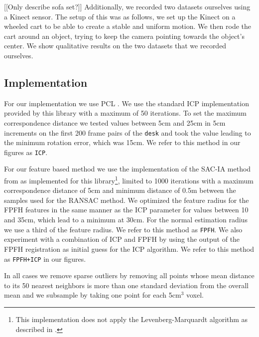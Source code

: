 \documentclass[a4paper]{article}
\begin{document}
[[Only describe sofa set?]]
Additionally, we recorded two datasets ourselves using a Kinect sensor. The setup of this was as follows, we set up the Kinect on a wheeled cart to be able to create a stable and uniform motion. We then rode the cart around an object, trying to keep the camera pointing towards the object's center. We show qualitative results on the two datasets that we recorded ourselves.

\subsection{Implementation}

For our implementation we use \ac{PCL} \cite{Rusu_ICRA2011_PCL}. We use the standard \ac{ICP} implementation provided by this library with a maximum of 50 iterations. To set the maximum correspondence distance we tested values between 5cm and 25cm in 5cm increments on the first 200 frame pairs of the \texttt{desk} and took the value leading to the minimum rotation error, which was 15cm. We refer to this method in our figures as \texttt{ICP}.

 For our feature based method we use the implementation of the \ac{SAC-IA} method from \cite{rusu2009fast} as implemented for this library\footnote{This implementation does not apply the Levenberg-Marquardt algorithm as described in \cite{rusu2009fast}.}, limited to 1000 iterations with a maximum correspondence distance of 5cm and minimum distance of 0.5m between the samples used for the \ac{RANSAC} method. We optimized the feature radius  for the \ac{FPFH} features in the same manner as the \ac{ICP} parameter for values between 10 and 35cm, which lead to a minimum at 30cm. For the normal estimation radius we use a third of the feature radius. We refer to this method as \texttt{FPFH}. We also experiment with a combination of \ac{ICP} and \ac{FPFH} by using the output of the \ac{FPFH} registration as initial guess for the \ac{ICP} algorithm. We refer to this method as \texttt{FPFH+ICP} in our figures.
 
In all cases we remove sparse outliers by removing all points whose mean distance to its 50 nearest neighbors is more than one standard deviation from the overall mean and we subsample by taking one point for each 5cm$^3$ voxel.

\end{document}
